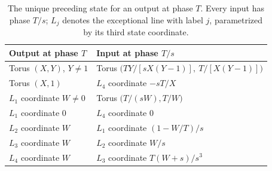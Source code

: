 \begin{table}[htbp]
\centering
\caption{The unique preceding state for an output at phase \(T\).
Every input has phase \(T/s\); \(L_j\) denotes the exceptional line
with label \(j\), parametrized by its third state coordinate.}
\label{tab:inverse}
\begin{tabular}{@{}ll@{}}
\toprule
Output at phase \(T\) & Input at phase \(T/s\) \\
\midrule
Torus \((X,Y)\), \(Y\ne1\)
& Torus \(\bigl(TY/[sX(Y-1)],\ T/[X(Y-1)]\bigr)\) \\
Torus \((X,1)\) & \(L_4\) coordinate \(-sT/X\) \\
\(L_1\) coordinate \(W\ne0\)
& Torus \(\bigl(T/(sW),T/W\bigr)\) \\
\(L_1\) coordinate \(0\) & \(L_4\) coordinate \(0\) \\
\(L_2\) coordinate \(W\) & \(L_1\) coordinate \((1-W/T)/s\) \\
\(L_3\) coordinate \(W\) & \(L_2\) coordinate \(W/s\) \\
\(L_4\) coordinate \(W\) & \(L_3\) coordinate \(T(W+s)/s^3\) \\
\bottomrule
\end{tabular}
\end{table}
